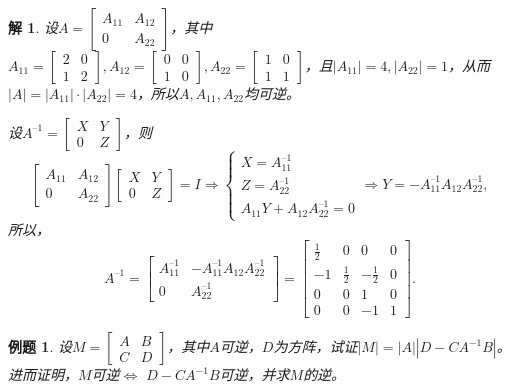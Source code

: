 \documentclass[a4paper]{book}
\newtheorem{eg}{例题}[chapter]
\newtheorem*{solution}{解}
\begin{document}
\begin{solution}
设$A = \begin{bmatrix} A_{11} & A_{12} \\ 0 & A_{22} \end{bmatrix}$，其中
$A_{11} = \begin{bmatrix} 2 & 0 \\ 1 & 2 \end{bmatrix}, A_{12} = \begin{bmatrix} 0 & 0 \\ 1 & 0 \end{bmatrix}, A_{22} = \begin{bmatrix} 1 & 0 \\ 1 & 1 \end{bmatrix}$，且$|A_{11}| = 4, |A_{22}| = 1$，从而$|A| = |A_{11}|\cdot|A_{22}| = 4$，所以$A, A_{11}, A_{22}$均可逆。

设$A^{–1} = \begin{bmatrix} X & Y \\ 0 & Z \end{bmatrix}$，则
$$\begin{bmatrix} A_{11} & A_{12} \\ 0 & A_{22} \end{bmatrix}\begin{bmatrix} X & Y \\ 0 & Z \end{bmatrix} = I \Longrightarrow
\begin{cases} X = A_{11}^{–1} \\ Z = A_{22}^{–1} \\ A_{11}Y + A_{12}A_{22}^{–1} = 0 \end{cases} \Longrightarrow
Y = -A_{11}^{–1}A_{12}A_{22}^{–1},$$
所以，
$$A^{–1} = \begin{bmatrix} A_{11}^{–1} & -A_{11}^{–1}A_{12}A_{22}^{–1} \\ 0 & A_{22}^{–1} \end{bmatrix} = \begin{bmatrix} \frac12 & 0 & 0 & 0 \\ -1 & \frac12 & -\frac12 & 0 \\ 0 & 0 & 1 & 0 \\ 0 & 0 & -1 & 1 \end{bmatrix}.$$
\end{solution}

\begin{eg}
设$M = \begin{bmatrix} A & B \\ C & D \end{bmatrix}$，其中$A$可逆，$D$为方阵，试证$|M| = |A||D-CA^{-1}B|$。进而证明，$M$可逆$\Longleftrightarrow$ $D-CA^{-1}B$可逆，并求$M$的逆。
\end{eg}
\end{document}

